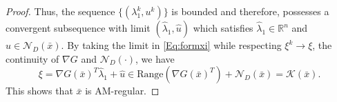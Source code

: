 \documentclass[10pt,a4paper]{amsart}
\begin{document}
\begin{proof}
 Thus, the sequence $\{(\lambda_1^k, u^k)\}$ is bounded and therefore, possesses a convergent subsequence with limit $(\hat \lambda_1, \hat u)$ which satisfies $\hat \lambda_1 \in \mathbb R^n$ and $\hat u \in \mathcal N_D (\bar x)$. By taking the limit in \eqref{Eq:formxi} while respecting $\xi^k \to \xi$, the continuity of $\nabla G$ and $\mathcal N_D(\cdot)$, we have
 \begin{equation*}
     \xi = \nabla G(\bar x)^T\hat \lambda_1 +\hat u \in \text{Range} (\nabla G(\bar x)^T)+ \mathcal N_D(\bar x)=\mathcal K(\bar x).
 \end{equation*}
 This shows that $\bar x$ is AM-regular.
\end{proof}
\end{document}
